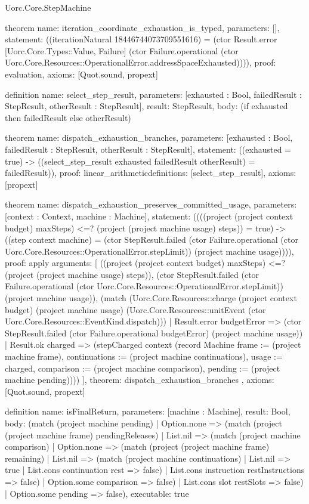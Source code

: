 \begin{lexlean}{Uorc.Core.StepMachine}
\begin{semanticmodule}
theorem{
  name: iteration_coordinate_exhaustion_is_typed,
  parameters: [],
  statement: ((iterationNatural 18446744073709551616) = (ctor Result.error [Uorc.Core.Types::Value, Failure] (ctor Failure.operational (ctor Uorc.Core.Resources::OperationalError.addressSpaceExhausted)))),
  proof: evaluation{},
  axioms: [Quot.sound, propext]
}

definition{
  name: select_step_result,
  parameters: [exhausted : Bool, failedResult : StepResult, otherResult : StepResult],
  result: StepResult,
  body: (if exhausted then failedResult else otherResult)
}

theorem{
  name: dispatch_exhaustion_branches,
  parameters: [exhausted : Bool, failedResult : StepResult, otherResult : StepResult],
  statement: ((exhausted = true) -> ((select_step_result exhausted failedResult otherResult) = failedResult)),
  proof: linear_arithmetic{definitions: [select_step_result]},
  axioms: [propext]
}

theorem{
  name: dispatch_exhaustion_preserves_committed_usage,
  parameters: [context : Context, machine : Machine],
  statement: ((((project (project context budget) maxSteps) <=? (project (project machine usage) steps)) = true) -> ((step context machine) = (ctor StepResult.failed (ctor Failure.operational (ctor Uorc.Core.Resources::OperationalError.stepLimit)) (project machine usage)))),
  proof: apply{
    arguments: [
      ((project (project context budget) maxSteps) <=? (project (project machine usage) steps)),
      (ctor StepResult.failed (ctor Failure.operational (ctor Uorc.Core.Resources::OperationalError.stepLimit)) (project machine usage)),
      (match (Uorc.Core.Resources::charge (project context budget) (project machine usage) (Uorc.Core.Resources::unitEvent (ctor Uorc.Core.Resources::EventKind.dispatch)))
        | Result.error budgetError => (ctor StepResult.failed (ctor Failure.operational budgetError) (project machine usage))
        | Result.ok charged => (stepCharged context (record Machine {frame := (project machine frame), continuations := (project machine continuations), usage := charged, comparison := (project machine comparison), pending := (project machine pending)})))
    ],
    theorem: dispatch_exhaustion_branches
  },
  axioms: [Quot.sound, propext]
}

definition{
  name: isFinalReturn,
  parameters: [machine : Machine],
  result: Bool,
  body: (match (project machine pending)
    | Option.none => (match (project (project machine frame) pendingReleases)
      | List.nil => (match (project machine comparison)
        | Option.none => (match (project (project machine frame) remaining)
          | List.nil => (match (project machine continuations)
            | List.nil => true
            | List.cons continuation rest => false)
          | List.cons instruction restInstructions => false)
        | Option.some comparison => false)
      | List.cons slot restSlots => false)
    | Option.some pending => false),
  executable: true
}


\end{semanticmodule}
\end{lexlean}
